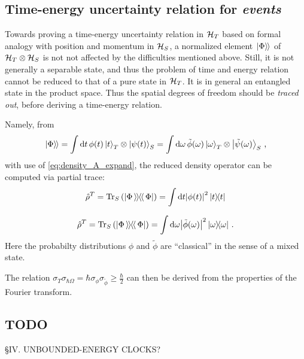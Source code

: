 \subsection{Time-energy uncertainty relation for \emph{events}}
Towards proving a time-energy uncertainty relation in $\mathcal{H}_T$
based on formal analogy with position and momentum in $\mathcal{H}_S$,
a normalized element $\left.\left| \Phi \right\rangle\hspace{-0.115em}\right\rangle$ of $\mathcal{H}_T\otimes\mathcal{H}_S$ 
is not not affected by the difficulties mentioned above.
Still, it is not generally
a separable state,
and thus
the problem of time and energy relation cannot be reduced to that of
a pure state in $\mathcal{H}_T$.
It is in general an entangled state in the product space.
Thus the spatial degrees of freedom should be \emph{traced out},
before deriving a time-energy relation.

Namely, from
\begin{equation}
  \left.\left| \Phi \right\rangle\hspace{-0.115em}\right\rangle =
    \int \dd{t} \phi(t) \ket{t}_T \otimes \ket{\psi(t)}_S =
    \int \dd \omega \, \tilde{\phi}(\omega) \ket{\omega}_T \otimes \ket{\tilde{\psi}(\omega)}_S \, \text{,}
\end{equation}
with use of \eqref{eq:density_A_expand}, the reduced density operator can be computed
via partial trace:
\[
  \hat{\rho}^T = \Tr_S\qty(\left| \Phi \left\rangle\hspace{-0.115em}\left\rangle \hspace{-0.115em} \right\langle\hspace{-0.115em}\right\langle \Phi \right|) = \int \dd t \abs{\phi(t)}^2 \ketbra{t}{t} 
\]

\[
  \hat{\rho}^T = \Tr_S\qty(\left| \Phi \left\rangle\hspace{-0.115em}\left\rangle \hspace{-0.115em} \right\langle\hspace{-0.115em}\right\langle \Phi \right|) = \int \dd \omega \abs{\tilde{\phi}(\omega)}^2 \ketbra{\omega}{\omega}
  \,\text{.} 
\]
Here the probabilty distributions $\phi$ and $\tilde{\phi}$
are ``classical'' in the sense of a mixed state.

The relation $\sigma_T\sigma_{\hbar\Omega} = \hbar \sigma_{\phi} \sigma_{\tilde{\phi}} \geq \frac{\hbar}{2}$
can then be derived from the properties of the Fourier transform.

\subsection{TODO}
\cite{Maccone:Pauli} \S IV.  UNBOUNDED-ENERGY CLOCKS?